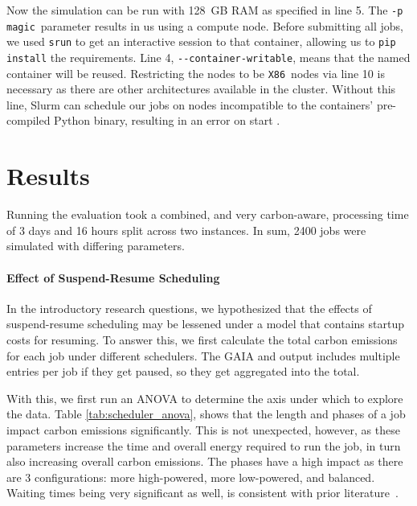 Now the simulation can be run with 128~GB RAM as specified in line 5. 
The \verb|-p magic|~parameter results in us using a compute node. 
Before submitting all jobs, we used \verb|srun| to get an interactive session to that container, allowing us to \verb|pip install| the requirements.
Line 4, \verb|--container-writable|, means that the named container will be reused.
Restricting the nodes to be \verb|X86|~nodes via line 10 is necessary as there are other architectures available in the cluster. 
Without this line, Slurm can schedule our jobs on nodes incompatible to the containers' pre-compiled Python binary, resulting in an error on start .

\section{Results}

Running the evaluation took a combined, and very carbon-aware, processing time of 3 days and 16 hours split across two instances.
In sum, 2400 jobs were simulated with differing parameters. 

\paragraph{Effect of Suspend-Resume Scheduling}

In the introductory research questions, we hypothesized that the effects of suspend-resume scheduling may be lessened under a model that contains startup costs for resuming. 
To answer this, we first calculate the total carbon emissions for each job under different schedulers. The GAIA and \programname{} output includes multiple entries per job if they get paused, so they get aggregated into the total.

With this, we first run an ANOVA to determine the axis under which to explore the data. Table \ref{tab:scheduler_anova}, shows that the length and phases of a job impact carbon emissions significantly.
This is not unexpected, however, as these parameters increase the time and overall energy required to run the job, in turn also increasing overall carbon emissions.
The phases have a high impact as there are 3 configurations: more high-powered, more low-powered, and balanced.
Waiting times being very significant as well, is consistent with prior literature~\cite{wiesner_lets_2021}.

